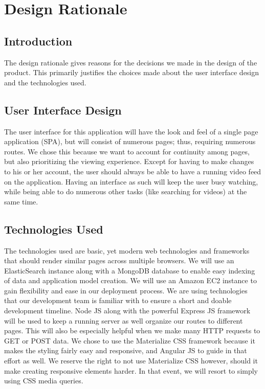 \chapter{Design Rationale}

\section{Introduction}
	The design rationale gives reasons for the decisions we made in the design of the product. This primarily justifies the choices made about the user interface design and the technologies used.
    
\section{User Interface Design}
	The user interface for this application will have the look and feel of a single page application (SPA), but will consist of numerous pages; thus, requiring numerous routes. We chose this because we want to account for continuity among pages, but also prioritizing the viewing experience. Except for having to make changes to his or her account, the user should always be able to have a running video feed on the application. Having an interface as such will keep the user busy watching, while being able to do numerous other tasks (like searching for videos) at the same time. 

\section{Technologies Used}
	The technologies used are basic, yet modern web technologies and frameworks that should render similar pages across multiple browsers. We will use an ElasticSearch instance along with a MongoDB database to enable easy indexing of data and application model creation. We will use an Amazon EC2 instance to gain flexibility and ease in our deployment process. We are using technologies that our development team is familiar with to ensure a short and doable development timeline. Node JS along with the powerful Express JS framework will be used to keep a running server as well organize our routes to different pages. This will also be especially helpful when we make many HTTP requests to GET or POST data. We chose to use the Materialize CSS framework because it makes the styling fairly easy and responsive, and Angular JS to guide in that effort as well. We reserve the right to not use Materialize CSS however, should it make creating responsive elements harder. In that event, we will resort to simply using CSS media queries. 